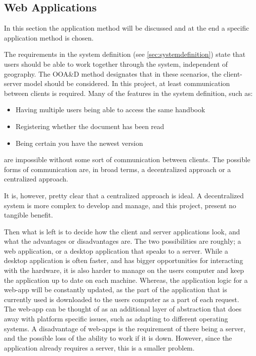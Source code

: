 \subsection{Web Applications}
In this section the application method will be discussed and at the end a specific application method is chosen.

The requirements in the system definition (see \cref{sec:systemdefinition}) state that users should be able to work together through the system, independent of geography.
The OOA\&D method designates that in these scenarios, the client-server model should be considered. \citep[p.~202]{Rod-Aalborg}
In this project, at least communication between clients is required.
Many of the features in the system definition, such as:
\begin{itemize}
\item Having multiple users being able to access the same handbook
\item Registering whether the document has been read
\item Being certain you have the newest version
\end{itemize}
are impossible without some sort of communication between clients.
The possible forms of communication are, in broad terms, a decentralized approach or a centralized approach.

It is, however, pretty clear that a centralized approach is ideal.
A decentralized system is more complex to develop and manage, and this project, present no tangible benefit.

Then what is left is to decide how the client and server applications look, and what the advantages or disadvantages are.
The two possibilities are roughly; a web application, or a desktop application that speaks to a server.
While a desktop application is often faster, and has bigger opportunities for interacting with the hardware, it is also harder to manage on the users computer and keep the application up to date on each machine.
Whereas, the application logic for a web-app will be constantly updated, as the part of the application that is currently used is downloaded to the users computer as a part of each request.
The web-app can be thought of as an additional layer of abstraction that does away with platform specific issues, such as adapting to different operating systems.
A disadvantage of web-apps is the requirement of there being a server, and the possible loss of the ability to work if it is down.
However, since the application already requires a server, this is a smaller problem.

